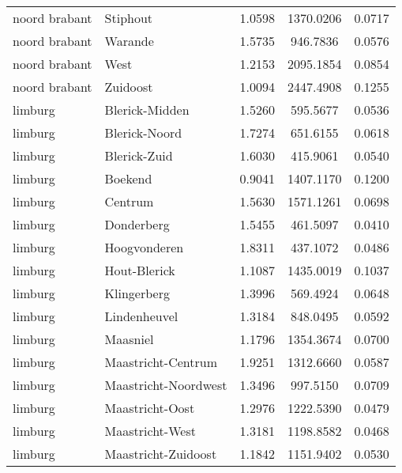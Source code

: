 \begin{longtable}{llccc}
	noord brabant & Stiphout                         & 1.0598  & 1370.0206 & 0.0717          \\
	noord brabant & Warande                          & 1.5735  & 946.7836  & 0.0576          \\
	noord brabant & West                             & 1.2153  & 2095.1854 & 0.0854          \\
	noord brabant & Zuidoost                         & 1.0094  & 2447.4908 & 0.1255          \\
	limburg       & Blerick-Midden                   & 1.5260  & 595.5677  & 0.0536          \\
	limburg       & Blerick-Noord                    & 1.7274  & 651.6155  & 0.0618          \\
	limburg       & Blerick-Zuid                     & 1.6030  & 415.9061  & 0.0540          \\
	limburg       & Boekend                          & 0.9041  & 1407.1170 & 0.1200          \\
	limburg       & Centrum                          & 1.5630  & 1571.1261 & 0.0698          \\
	limburg       & Donderberg                       & 1.5455  & 461.5097  & 0.0410          \\
	limburg       & Hoogvonderen                     & 1.8311  & 437.1072  & 0.0486          \\
	limburg       & Hout-Blerick                     & 1.1087  & 1435.0019 & 0.1037          \\
	limburg       & Klingerberg                      & 1.3996  & 569.4924  & 0.0648          \\
	limburg       & Lindenheuvel                     & 1.3184  & 848.0495  & 0.0592          \\
	limburg       & Maasniel                         & 1.1796  & 1354.3674 & 0.0700          \\
	limburg       & Maastricht-Centrum               & 1.9251  & 1312.6660 & 0.0587          \\
	limburg       & Maastricht-Noordwest             & 1.3496  & 997.5150  & 0.0709          \\
	limburg       & Maastricht-Oost                  & 1.2976  & 1222.5390 & 0.0479          \\
	limburg       & Maastricht-West                  & 1.3181  & 1198.8582 & 0.0468          \\
	limburg       & Maastricht-Zuidoost              & 1.1842  & 1151.9402 & 0.0530          \\

\end{longtable}
